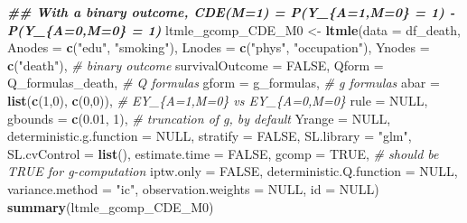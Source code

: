 \documentclass[
]{book}
\newenvironment{Shaded}{\begin{snugshade}}{\end{snugshade}}
\newcommand{\AttributeTok}[1]{\textcolor[rgb]{0.13,0.29,0.53}{#1}}
\newcommand{\CommentTok}[1]{\textcolor[rgb]{0.56,0.35,0.01}{\textit{#1}}}
\newcommand{\ConstantTok}[1]{\textcolor[rgb]{0.56,0.35,0.01}{#1}}
\newcommand{\DecValTok}[1]{\textcolor[rgb]{0.00,0.00,0.81}{#1}}
\newcommand{\DocumentationTok}[1]{\textcolor[rgb]{0.56,0.35,0.01}{\textbf{\textit{#1}}}}
\newcommand{\FloatTok}[1]{\textcolor[rgb]{0.00,0.00,0.81}{#1}}
\newcommand{\FunctionTok}[1]{\textcolor[rgb]{0.13,0.29,0.53}{\textbf{#1}}}
\newcommand{\NormalTok}[1]{#1}
\newcommand{\OtherTok}[1]{\textcolor[rgb]{0.56,0.35,0.01}{#1}}
\newcommand{\StringTok}[1]{\textcolor[rgb]{0.31,0.60,0.02}{#1}}
\begin{document}
\begin{Shaded}
\begin{Highlighting}[]
\DocumentationTok{\#\# With a binary outcome, CDE(M=1) = P(Y\_\{A=1,M=0\} = 1) {-} P(Y\_\{A=0,M=0\} = 1)}
\NormalTok{ltmle\_gcomp\_CDE\_M0 }\OtherTok{\textless{}{-}} \FunctionTok{ltmle}\NormalTok{(}\AttributeTok{data =}\NormalTok{ df\_death,}
                            \AttributeTok{Anodes =} \FunctionTok{c}\NormalTok{(}\StringTok{"edu"}\NormalTok{, }\StringTok{"smoking"}\NormalTok{),}
                            \AttributeTok{Lnodes =} \FunctionTok{c}\NormalTok{(}\StringTok{"phys"}\NormalTok{, }\StringTok{"occupation"}\NormalTok{),}
                            \AttributeTok{Ynodes =} \FunctionTok{c}\NormalTok{(}\StringTok{"death"}\NormalTok{), }\CommentTok{\# binary outcome}
                            \AttributeTok{survivalOutcome =} \ConstantTok{FALSE}\NormalTok{,}
                            \AttributeTok{Qform =}\NormalTok{ Q\_formulas\_death, }\CommentTok{\# Q formulas}
                            \AttributeTok{gform =}\NormalTok{ g\_formulas, }\CommentTok{\# g formulas}
                            \AttributeTok{abar =} \FunctionTok{list}\NormalTok{(}\FunctionTok{c}\NormalTok{(}\DecValTok{1}\NormalTok{,}\DecValTok{0}\NormalTok{),}
                                        \FunctionTok{c}\NormalTok{(}\DecValTok{0}\NormalTok{,}\DecValTok{0}\NormalTok{)), }\CommentTok{\# EY\_\{A=1,M=0\} vs EY\_\{A=0,M=0\}}
                            \AttributeTok{rule =} \ConstantTok{NULL}\NormalTok{,}
                            \AttributeTok{gbounds =} \FunctionTok{c}\NormalTok{(}\FloatTok{0.01}\NormalTok{, }\DecValTok{1}\NormalTok{), }\CommentTok{\# truncation of g, by default}
                            \AttributeTok{Yrange =} \ConstantTok{NULL}\NormalTok{,}
                            \AttributeTok{deterministic.g.function =} \ConstantTok{NULL}\NormalTok{,}
                            \AttributeTok{stratify =} \ConstantTok{FALSE}\NormalTok{,}
                            \AttributeTok{SL.library =} \StringTok{"glm"}\NormalTok{,}
                            \AttributeTok{SL.cvControl =} \FunctionTok{list}\NormalTok{(),}
                            \AttributeTok{estimate.time =} \ConstantTok{FALSE}\NormalTok{,}
                            \AttributeTok{gcomp =} \ConstantTok{TRUE}\NormalTok{, }\CommentTok{\# should be TRUE for g{-}computation}
                            \AttributeTok{iptw.only =} \ConstantTok{FALSE}\NormalTok{,}
                            \AttributeTok{deterministic.Q.function =} \ConstantTok{NULL}\NormalTok{,}
                            \AttributeTok{variance.method =} \StringTok{"ic"}\NormalTok{,}
                            \AttributeTok{observation.weights =} \ConstantTok{NULL}\NormalTok{,}
                            \AttributeTok{id =} \ConstantTok{NULL}\NormalTok{)}
\FunctionTok{summary}\NormalTok{(ltmle\_gcomp\_CDE\_M0)}
\end{Highlighting}
\end{Shaded}
\end{document}
